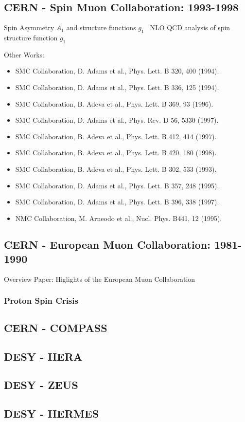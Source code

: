 \subsection{CERN - Spin Muon Collaboration: 1993-1998}
Spin Asymmetry $A_1$ and structure functions $g_1$~\cite{Adeva1998}
NLO QCD analysis of spin structure function $g_1$~\cite{Adeva1998a}

Other Works:
\begin{itemize}
	\item SMC Collaboration, D. Adams et al., Phys. Lett. B 320, 400 (1994).
	\item SMC Collaboration, D. Adams et al., Phys. Lett. B 336, 125 (1994).
	\item SMC Collaboration, B. Adeva et al., Phys. Lett. B 369, 93 (1996).
	\item SMC Collaboration, D. Adams et al., Phys. Rev. D 56, 5330 (1997).
	\item SMC Collaboration, B. Adeva et al., Phys. Lett. B 412, 414 (1997).
	\item SMC Collaboration, B. Adeva et al., Phys. Lett. B 420, 180 (1998).
	\item SMC Collaboration, B. Adeva et al., Phys. Lett. B 302, 533 (1993).
	\item SMC Collaboration, D. Adams et al., Phys. Lett. B 357, 248 (1995).
	\item SMC Collaboration, D. Adams et al., Phys. Lett. B 396, 338 (1997).
	\item NMC Collaboration, M. Arneodo et al., Nucl. Phys. B441, 12 (1995).
\end{itemize}

\subsection{CERN - European Muon Collaboration: 1981-1990}
Overview Paper: Higlights of the European Muon Collaboration
~\cite{Kullander1990a}
\subsubsection{Proton Spin Crisis}
\subsection{CERN - COMPASS}
\subsection{DESY - HERA}
\subsection{DESY - ZEUS}
\subsection{DESY - HERMES}

